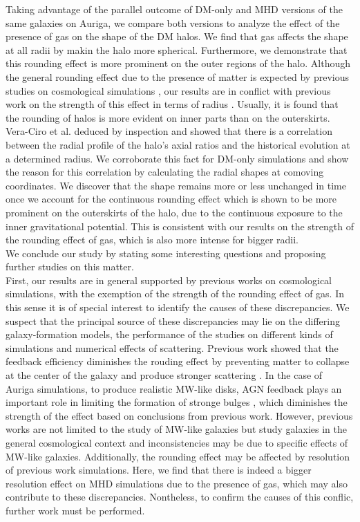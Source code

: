 Taking advantage of the parallel outcome of DM-only and MHD versions of the same galaxies on Auriga, we compare both versions to analyze the effect of the presence of gas on the shape of the DM halos. We find that gas affects the shape at all radii by makin the halo more spherical. Furthermore, we demonstrate that this rounding effect is more prominent on the outer regions of the halo. Although the general rounding effect due to the presence of matter is expected by previous studies on cosmological simulations \cite{}, our results are in conflict with previous work on the strength of this effect in terms of radius \cite{}. Usually, it is found that the rounding of halos is more evident on inner parts than on the outerskirts.\\

Vera-Ciro et al. deduced by inspection and showed that there is a correlation between the radial profile of the halo's axial ratios and the historical evolution at a determined radius. We corroborate this fact for DM-only simulations and show the reason for this correlation by calculating the radial shapes at comoving coordinates. We discover that the shape remains more or less unchanged in time once we account for the continuous rounding effect which is shown to be more prominent on the outerskirts of the halo, due to the continuous exposure to the inner gravitational potential. This is consistent with our results on the strength of the rounding effect of gas, which is also more intense for bigger radii.\\

We conclude our study by stating some interesting questions and proposing further studies on this matter.\\

First, our results are in general supported by previous works on cosmological simulations, with the exemption of the strength of the rounding effect of gas. In this sense it is of special interest to identify the causes of these discrepancies. We suspect that the principal source of these discrepancies may lie on the differing galaxy-formation models, the performance of the studies on different kinds of simulations and numerical effects of scattering. Previous work showed that the feedback efficiency diminishes the rouding effect by preventing matter to collapse at the center of the galaxy and produce stronger scattering \cite{}. In the case of Auriga simulations, to produce realistic MW-like disks, AGN feedback plays an important role in limiting the formation of stronge bulges \cite{Auriga}, which diminishes the strength of the effect based on conclusions from previous work. However, previous works are not limited to the study of MW-like galaxies but study galaxies in the general cosmological context \cite{studies} and inconsistencies may be due to specific effects of MW-like galaxies. Additionally, the rounding effect may be affected by resolution of previous work simulations. Here, we find that there is indeed a bigger resolution effect on MHD simulations due to the presence of gas, which may also contribute to these discrepancies. Nontheless, to confirm the causes of this conflic, further work must be performed.\\

